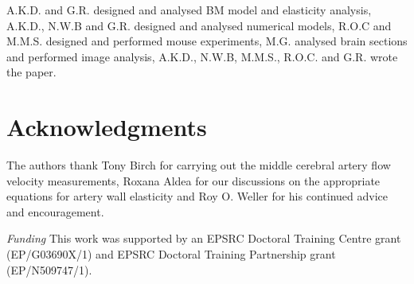 \documentclass{frontiersFPHY} %
\begin{document}
A.K.D. and G.R. designed and analysed BM model and elasticity analysis, A.K.D., N.W.B and G.R. designed and analysed numerical models, R.O.C and M.M.S. designed and performed mouse experiments, M.G. analysed brain sections and performed image analysis, A.K.D., N.W.B, M.M.S., R.O.C. and G.R. wrote the paper.


\section*{Acknowledgments}
The authors thank Tony Birch for carrying out the middle cerebral artery flow velocity measurements, Roxana Aldea for our discussions on the appropriate equations for artery wall elasticity and Roy O. Weller for his continued advice and encouragement.


\textit{Funding\textcolon} This work was supported by an EPSRC Doctoral Training Centre grant (EP/G03690X/1) and EPSRC Doctoral Training Partnership grant (EP/N509747/1).
\end{document}
